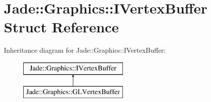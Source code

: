 \hypertarget{struct_jade_1_1_graphics_1_1_i_vertex_buffer}{}\section{Jade\+:\+:Graphics\+:\+:I\+Vertex\+Buffer Struct Reference}
\label{struct_jade_1_1_graphics_1_1_i_vertex_buffer}
Inheritance diagram for Jade\+:\+:Graphics\+:\+:I\+Vertex\+Buffer\+:\begin{figure}[H]
\begin{center}
\leavevmode
\includegraphics[height=2.000000cm]{struct_jade_1_1_graphics_1_1_i_vertex_buffer}
\end{center}
\end{figure}
